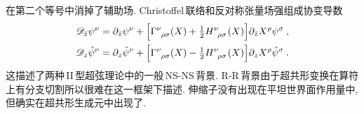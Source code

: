 在第二个等号中消掉了辅助场. Christoffel\,联络和反对称张量场强组成协变导数
\begin{subequations}
\begin{align}
    \mathscr{D}_{\bar{z}}\psi^{\nu} &= \partial_{\bar{z}}\psi^{\nu}
    +\Bigl[\Gamma\indices{^\nu_\rho_\sigma}(X)+\tfrac{1}{2}H\indices{^\nu_\rho_\sigma}(X)\Bigr]\partial_{\bar{z}}X^{\rho}\psi^{\sigma} \:, \label{12.3.28a} \\
    \mathscr{D}_{z}\tilde{\psi}^{\nu} &= \partial_{z}\tilde{\psi}^{\nu} 
    +\Bigl[\Gamma\indices{^\nu_\rho_\sigma}(X)-\tfrac{1}{2}H\indices{^\nu_\rho_\sigma}(X)\Bigr]
    \partial_{z}X^{\rho}\tilde{\psi}^{\sigma} \:. \label{12.3.28b}
\end{align} \label{12.3.28}
\end{subequations}
这描述了两种\,II\,型超弦理论中的一般\,NS-NS\,背景. R-R\,背景由于超共形变换在算符上有分支切割所以很难在这一框架下描述. 伸缩子没有出现在平坦世界面作用量中, 但确实在超共形生成元中出现了.

